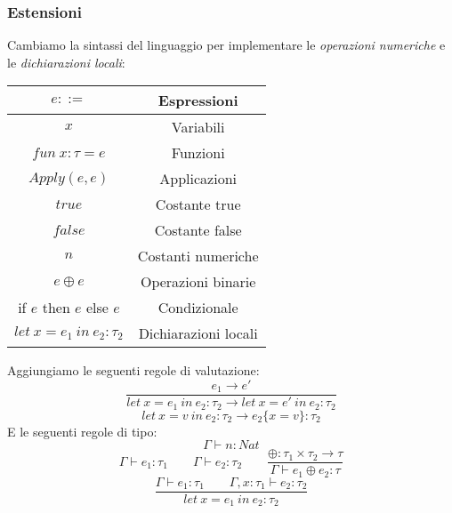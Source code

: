 \subsubsection{Estensioni}
Cambiamo la sintassi del linguaggio per implementare le \textit{operazioni numeriche} e le \textit{dichiarazioni locali}:
\begin{center}
	\begin{tabular}{|c|c|}
		\hline
		$e ::=$ & Espressioni\\
		\hline
		$x$ & Variabili\\
		$fun \: x:\tau = e$ & Funzioni\\
		$Apply(e,e)$ & Applicazioni \\
		$true$ & Costante true\\
		$false$ & Costante false\\
		$n$ & Costanti numeriche\\
		$e \oplus e$ & Operazioni binarie \\
		if $e$ then $e$ else $e$ & Condizionale\\
		$let \: x = e_1 \: in \: e_2 : \tau_2$ & Dichiarazioni locali \\
		\hline
	\end{tabular}
\end{center}
Aggiungiamo le seguenti regole di valutazione:
\begin{equation}
	\frac{e_1 \rightarrow e'}{let \: x = e_1 \: in \: e_2 : \tau_2 \rightarrow let \: x = e' \: in \: e_2:\tau_2}
\end{equation}
\begin{equation}
	let \: x = v \: in \: e_2:\tau_2 \rightarrow e_2 \{x=v\}:\tau_2
\end{equation}
E le seguenti regole di tipo:
\begin{equation}
	\Gamma \vdash n:Nat
\end{equation}
\begin{equation}
	\Gamma \vdash e_1: \tau_1 \qquad \Gamma \vdash e_2:\tau_2 \qquad \frac{\oplus:\tau_1 \times \tau_2 \rightarrow \tau}{\Gamma \vdash e_1 \oplus e_2 : \tau}
\end{equation}
\begin{equation}
	\frac{\Gamma \vdash e_1 : \tau_1 \qquad \Gamma,x:\tau_1 \vdash e_2:\tau_2}{let \: x = e_1 \: in \: e_2 : \tau_2}
\end{equation}
